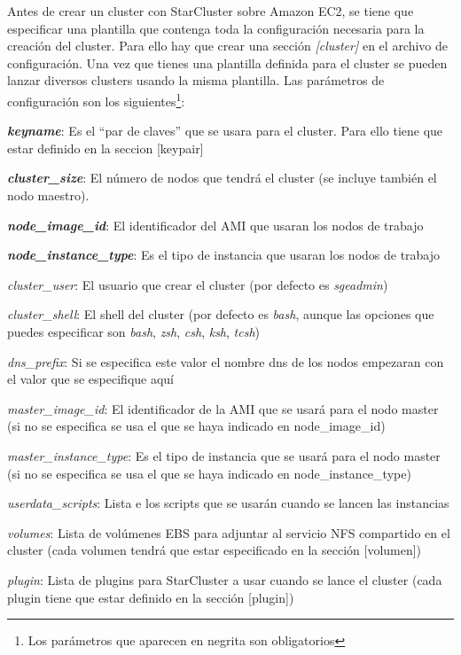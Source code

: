 \documentclass{article}
\begin{document}
	Antes de crear un cluster con StarCluster sobre Amazon EC2, se tiene que especificar una plantilla que contenga toda la configuración necesaria para la creación del cluster. Para ello hay que crear una sección \emph{[cluster]} en el archivo de configuración. Una vez que tienes una plantilla definida para el cluster se pueden lanzar diversos clusters usando la misma plantilla. Las parámetros de configuración son los siguientes\footnote{Los parámetros que aparecen en negrita son obligatorios}:
{\setlength{\parskip}{0mm} \begin{itemize}
{\setlength{\parskip}{0mm}
	\item 	\textbf{\emph{keyname}}: Es el ``par de claves'' que se usara para el cluster. Para ello tiene que estar definido en la seccion [keypair]
	\item \textbf{\emph{cluster\_size}}: El número de nodos que tendrá el cluster (se incluye también el nodo maestro).
	\item \textbf{\emph{node\_image\_id}}: El identificador del AMI que usaran los nodos de trabajo
	\item \textbf{\emph{node\_instance\_type}}: Es el tipo de instancia que usaran los nodos de trabajo
	\item \emph{cluster\_user}: El usuario que crear el cluster (por defecto es \emph{sgeadmin})
	\item \emph{cluster\_shell}: El shell del cluster (por defecto es \emph{bash}, aunque las opciones que puedes especificar son \emph{bash}, \emph{zsh}, \emph{csh}, \emph{ksh}, \emph{tcsh})
	\item \emph{dns\_prefix}: Si se especifica este valor el nombre dns de los nodos empezaran con el valor que se especifique aquí
	\item \emph{master\_image\_id}: El identificador de la AMI que se usará para el nodo master (si no se especifica se usa el que se haya indicado en node\_image\_id)
	\item \emph{master\_instance\_type}: Es el tipo de instancia que se usará para el nodo master (si no se especifica se usa el que se haya indicado en node\_instance\_type)
	\item \emph{userdata\_scripts}: Lista e los scripts que se usarán cuando se lancen las instancias
	\item \emph{volumes}: Lista de volúmenes EBS para adjuntar al servicio NFS compartido en el cluster (cada volumen tendrá que estar especificado en la sección [volumen])
	\item \emph{plugin}: Lista de plugins para StarCluster a usar cuando se lance el cluster (cada plugin tiene que estar definido en la sección [plugin])
}
\end{itemize}}
\end{document}
